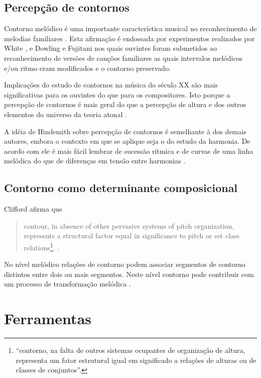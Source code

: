 \documentclass[12pt,brazil]{book}
\newcommand{\citacaolonga}[4]{
  \begin{quote}
    \normalsize
    {#1}\footnote{
      \selectlanguage{brazil}
      ``{#2}''.
    }.
    \selectlanguage{brazil}
    \cite[#3]{#4}.
  \end{quote}
}
\begin{document}
\section{Percepção de contornos}
\label{sec:perc-de-cont}

Contorno melódico é uma importante característica musical no
reconhecimento de melodias familiares
\cite[p. 136]{dowling.ea86:music}. Esta afirmação é endossada por
experimentos realizados por White \cite{white60:recognition}, e
Dowling e Fujitani \cite{dowling.ea71:contour} nos quais ouvintes
foram submetidos ao reconhecimento de versões de canções familiares as
quais intervalos melódicos e/ou ritmo eram modificados e o contorno
preservado.

Implicações do estudo de contornos na música do século XX são mais
significativas para os ouvintes do que para os compositores. Isto
porque a percepção de contornos é mais geral do que a percepção de
altura e dos outros elementos do universo da teoria atonal
\cite[p. 224]{friedmann85:methodology}.

A idéia de Hindemith sobre percepção de contornos é semelhante à dos
demais autores, embora o contexto em que se aplique seja o do estudo
da harmonia. De acordo com ele é mais fácil lembrar de sucessão
rítmica e de curvas de uma linha melódica do que de diferenças em
tensão entre harmonias \cite[p. 175]{hindemith41:craft}.

\section{Contorno como determinante composicional}
\label{sec:cont-como-determ}

Clifford afirma que


\citacaolonga{contour, in absence of other pervasive systems of pitch
  organization, represents a structural factor equal in significance
  to pitch or set class relations}{contorno, na falta de outros
  sistemas ocupantes de organização de altura, representa um fator
  estrutural igual em significado a relações de alturas ou de classes
  de conjuntos}{p. 157}{clifford95:contour}

No nível melódico relações de contorno podem associar segmentos de
contorno distintos entre dois ou mais segmentos. Neste nível contorno
pode contribuir com um processo de transformação melódica
\cite[p. 159]{clifford95:contour}.

\chapter{Ferramentas}
\label{cha:ferramentas}
\end{document}
